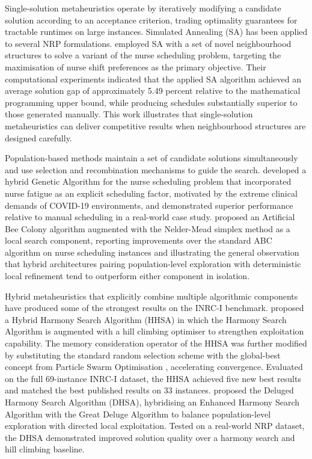 \documentclass[12pt, a4paper, oneside]{report}
\begin{document}
Single-solution metaheuristics operate by iteratively modifying a
candidate solution according to an acceptance criterion, trading
optimality guarantees for tractable runtimes on large instances.
Simulated Annealing (SA) \citep{Kirkpatrick1983} has been applied to several NRP
formulations. \citet{Jafari2015} employed SA with a set of novel
neighbourhood structures to solve a variant of the nurse scheduling
problem, targeting the maximisation of nurse shift preferences as the
primary objective. Their computational experiments indicated that the
applied SA algorithm achieved an average solution gap of
approximately 5.49 percent relative to the mathematical programming
upper bound, while producing schedules substantially superior to
those generated manually. This work illustrates that single-solution
metaheuristics can deliver competitive results when neighbourhood
structures are designed carefully.

Population-based methods maintain a set of candidate solutions
simultaneously and use selection and recombination mechanisms to
guide the search. \citet{Amindoust2021} developed a hybrid Genetic
Algorithm \citep{Holland1992} for the nurse scheduling problem that incorporated nurse
fatigue as an explicit scheduling factor, motivated by the extreme
clinical demands of COVID-19 environments, and demonstrated superior
performance relative to manual scheduling in a real-world case study.
\citet{Muniyan2022} proposed an Artificial Bee Colony algorithm \citep{Karaboga2007}
augmented with the Nelder-Mead simplex method as a local search
component, reporting improvements over the standard ABC algorithm on
nurse scheduling instances and illustrating the general observation
that hybrid architectures pairing population-level exploration with
deterministic local refinement tend to outperform either component in
isolation.

Hybrid metaheuristics that explicitly combine multiple algorithmic
components have produced some of the strongest results on the INRC-I
benchmark. \citet{Awadallah2015} proposed a Hybrid Harmony Search
Algorithm (HHSA) in which the Harmony Search Algorithm \citep{Geem2001} is augmented
with a hill climbing optimiser to strengthen exploitation capability.
The memory consideration operator of the HHSA was further modified
by substituting the standard random selection scheme with the
global-best concept from Particle Swarm Optimisation \citep{Kennedy1995}, accelerating
convergence. Evaluated on the full 69-instance INRC-I dataset, the
HHSA achieved five new best results and matched the best published
results on 33 instances. \citet{Hadwan2019} proposed the Deluged
Harmony Search Algorithm (DHSA), hybridising an Enhanced Harmony
Search Algorithm with the Great Deluge Algorithm to balance
population-level exploration with directed local exploitation. Tested
on a real-world NRP dataset, the DHSA demonstrated improved solution
quality over a harmony search and hill climbing baseline.
\end{document}
